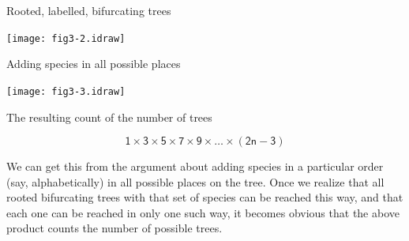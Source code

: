 \documentclass[bluish,slideColor,colorBG,pdf]{prosper}
\begin{document}
\begin{slide}[Replace]{Rooted, labelled, bifurcating trees}

\centerline{\texttt{[image: fig3-2.idraw]}}

\end{slide}

\begin{slide}[Replace]{Adding species in all possible places}

\centerline{\texttt{[image: fig3-3.idraw]}}

\end{slide}

\begin{slide}[Replace]{The resulting count of the number of trees}
\bigskip

{\large
\[
\mathsf{1 \times 3 \times 5 \times 7 \times 9 \times \dots \times (2n-3)} 
\]
}
\bigskip

We can get this from the argument about adding species in a particular
order (say, alphabetically) in all possible places on the tree.  Once we
realize that all rooted bifurcating trees with that set of species can be
reached this way, and that each one can be reached in only one such way,
it becomes obvious that the above product counts the number of possible trees.

\end{slide}
\end{document}
